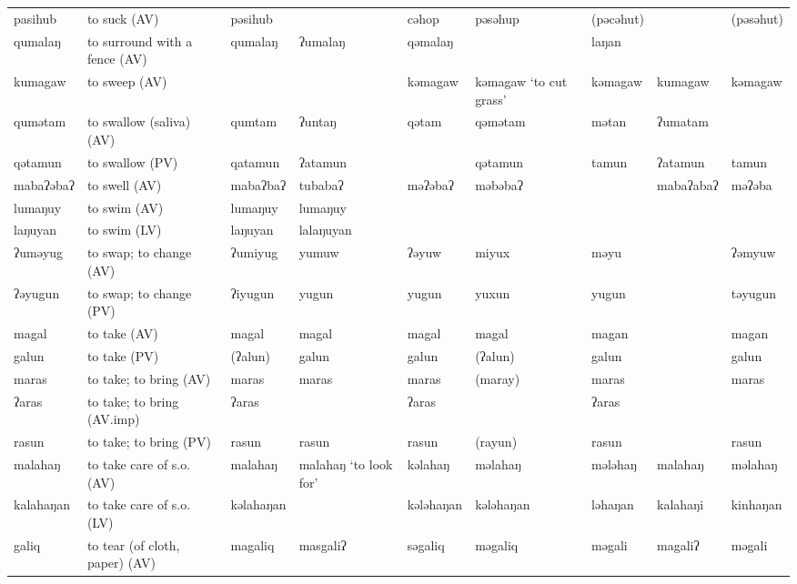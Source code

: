 \begin{landscape}
\begin{longtable}{*{9}{>{\raggedright\arraybackslash}p{}}}
\text{*}pasihub      & to suck (AV) & pəsihub &  & cəhop & pəsəhup & (pəcəhut) &  & (pəsəhut)\\
\text{*}qumalaŋ      & to surround with a fence (AV) & qumalaŋ & ʔumalaŋ & qəmalaŋ &  & laŋan &  & \\
\text{*}kumagaw      & to sweep (AV) &  &  & kəmagaw & kəmagaw \newline `to cut grass' & kəmagaw & kumagaw & kəmagaw\\
\text{*}qumətam      & to swallow (saliva) (AV) & qumtam & ʔuntaŋ & qətam & qəmətam & mətan & ʔumatam & \\
\text{*}qətamun      & to swallow (PV) & qatamun & ʔatamun &  & qətamun & tamun & ʔatamun & tamun\\
\text{*}mabaʔəbaʔ    & to swell (AV) & mabaʔbaʔ & tubabaʔ & məʔəbaʔ & məbəbaʔ &  & mabaʔabaʔ & məʔəba\\
\text{*}lumaŋuy      & to swim (AV) & lumaŋuy & lumaŋuy &  &  &  &  & \\
\text{*}laŋuyan      & to swim (LV) & laŋuyan & lalaŋuyan &  &  &  &  & \\
\text{*}ʔuməyug      & to swap; to change (AV) & ʔumiyug & yumuw & ʔəyuw & miyux & məyu &  & ʔəmyuw\\
\text{*}ʔəyugun      & to swap; to change (PV) & ʔiyugun & yugun & yugun & yuxun & yugun &  & təyugun\\
\text{*}magal        & to take (AV) & magal & magal & magal & magal & magan &  & magan\\
\text{*}galun        & to take (PV) & (ʔalun) & galun & galun & (ʔalun) & galun &  & galun\\
\text{*}maras        & to take; to bring (AV) & maras & maras & maras & (maray) & maras &  & maras\\
\text{*}ʔaras        & to take; to bring (AV.imp) & ʔaras &  & ʔaras &  & ʔaras &  & \\
\text{*}rasun        & to take; to bring (PV) & rasun & rasun & rasun & (rayun) & rasun &  & rasun\\
\text{*}malahaŋ      & to take care of s.o. (AV) & malahaŋ & malahaŋ \newline `to look for' & kəlahaŋ & məlahaŋ & mələhaŋ & malahaŋ & məlahaŋ\\
\text{*}kalahaŋan    & to take care of s.o. (LV) & kəlahaŋan &  & kələhaŋan & kələhaŋan & ləhaŋan & kalahaŋi & kinhaŋan\\
\text{*}galiq       & to tear (of cloth, paper) (AV) & magaliq & masgaliʔ & səgaliq & məgaliq & məgali & magaliʔ & məgali\\

\end{longtable}
\end{landscape}
